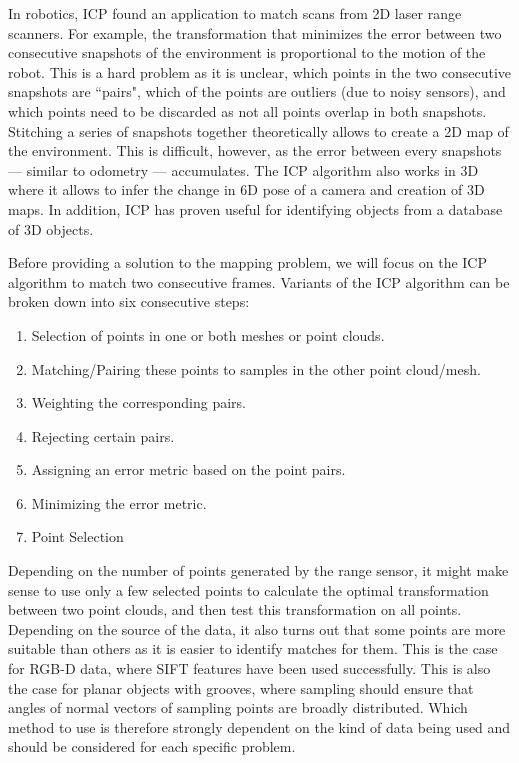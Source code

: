 In robotics, ICP found an application to match scans from 2D laser range scanners. For example, the transformation that minimizes the error between two consecutive snapshots of the environment is proportional to the motion of the robot. This is a hard problem as it is unclear, which points in the two consecutive snapshots are ``pairs", which of the points are outliers (due to noisy sensors), and which points need to be discarded as not all points overlap in both snapshots. Stitching a series of snapshots together theoretically allows to create a 2D map of the environment. This is difficult, however, as the error between every snapshots --- similar to odometry --- accumulates.   The ICP algorithm also works in 3D where it allows to infer the change in 6D pose of a camera and creation of 3D maps. In addition, ICP has proven useful for identifying objects from a database of 3D objects.

Before providing a solution to the mapping problem, we will focus on the ICP algorithm to match two consecutive frames. Variants of the ICP algorithm can be broken down into six consecutive steps:
\begin{enumerate}
    \item Selection of points in one or both meshes or point clouds.
    \item Matching/Pairing these points to samples in the other point cloud/mesh.
    \item Weighting the corresponding pairs.
    \item Rejecting certain pairs.
    \item Assigning an error metric based on the point pairs.
    \item Minimizing the error metric.
    \item Point Selection
\end{enumerate}
Depending on the number of points generated by the range sensor, it might make sense to use only a few selected points to calculate the optimal transformation between two point clouds, and then test this transformation on all points. Depending on the source of the data, it also turns out that some points are more suitable than others as it is easier to identify matches for them. This is the case for RGB-D data, where SIFT features have been used successfully. This is also the case for planar objects with grooves, where sampling should ensure that angles of normal vectors of sampling points are broadly distributed. Which method to use is therefore strongly dependent on the kind of data being used and should be considered for each specific problem.

